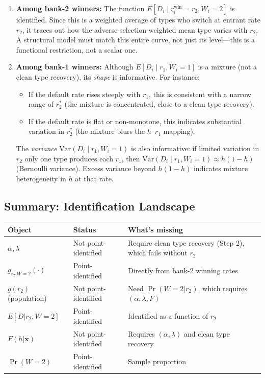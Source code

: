 \documentclass[12pt]{article}
\theoremstyle{plain}
\theoremstyle{plain}
\theoremstyle{definition}  %
\theoremstyle{remark}  %
\begin{document}
\begin{enumerate}
    \item \textbf{Among bank-2 winners:} The function $E[D_i \mid r_i^{\text{win}} = r_2, W_i = 2]$ is identified. Since this is a weighted average of types who switch at entrant rate $r_2$, it traces out how the adverse-selection-weighted mean type varies with $r_2$.  A structural model must match this entire curve, not just its level---this is a functional restriction, not a scalar one.
    
    \item \textbf{Among bank-1 winners:} Although $E[D_i \mid r_1, W_i = 1]$ is a mixture (not a clean type recovery), its \emph{shape} is informative.  For instance:
    \begin{itemize}
      \item If the default rate rises steeply with $r_1$, this is consistent with a narrow range of $r_2^*$ (the mixture is concentrated, close to a clean type recovery).
      \item If the default rate is flat or non-monotone, this indicates substantial variation in $r_2^*$ (the mixture blurs the $h$--$r_1$ mapping).
    \end{itemize}
    The \emph{variance} $\text{Var}(D_i \mid r_1, W_i = 1)$ is also informative: if limited variation in $r_2$ only one type produces each $r_1$, then $\text{Var}(D_i \mid r_1, W_i=1) \approx h(1-h)$ (Bernoulli variance). Excess variance beyond $h(1-h)$ indicates mixture heterogeneity in $h$ at that rate.
\end{enumerate}

\subsection{Summary: Identification Landscape}\label{sec:landscape}

\begin{center}
\renewcommand{\arraystretch}{1.5}
\begin{tabular}{p{4cm}p{3.5cm}p{5.5cm}}
\toprule
\textbf{Object} & \textbf{Status} & \textbf{What's missing} \\
\midrule
$\alpha, \lambda$ & Not point-identified & Require clean type recovery (Step 2), which fails without $r_2$ \\[2pt]
$g_{r_2|W=2}(\cdot)$ & Point-identified & Directly from bank-2 winning rates \\[2pt]
$g(r_2)$ (population) & Not point-identified & Need $\Pr(W\!=\!2|r_2)$, which requires $(\alpha,\lambda,F)$ \\[2pt]
$E[D|r_2, W\!=\!2]$ & Point-identified & Identified as a function of $r_2$ \\[2pt]
$F(h|\mathbf{x})$ & Not point-identified & Requires $(\alpha,\lambda)$ and clean type recovery \\[2pt]
$\Pr(W\!=\!2)$ & Point-identified & Sample proportion \\
\bottomrule
\end{tabular}
\end{center}
\end{document}
